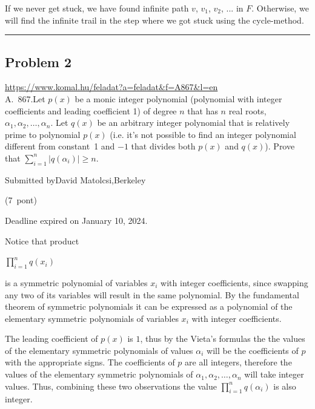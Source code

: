 \documentclass{article}
\begin{document}
If we never get stuck, we have found infinite path \(\displaystyle v\), \(\displaystyle v_1\), \(\displaystyle v_2\), ... in \(\displaystyle F\). Otherwise, we will find the infinite trail in the step where we got stuck using the cycle-method.

\vspace{1em}
\hrule
\vspace{1em}

\subsection*{Problem 2}
\noindent\url{https://www.komal.hu/feladat?a=feladat&f=A867&l=en}\\[1em]

A. 867.Let \(\displaystyle p(x)\) be a monic integer polynomial (polynomial with integer coefficients and leading coefficient 1) of degree \(\displaystyle n\) that has \(\displaystyle n\) real roots, \(\displaystyle \alpha_1, \alpha_2,\ldots, \alpha_n\). Let \(\displaystyle q(x)\) be an arbitrary integer polynomial that is relatively prime to polynomial \(\displaystyle p(x)\) (i.e. it's not possible to find an integer polynomial different from constant 1 and \(\displaystyle -1\) that divides both \(\displaystyle p(x)\) and \(\displaystyle q(x)\)). Prove that \(\displaystyle \sum\limits_{i=1}^{n} \big|q(\alpha_i)\big|\ge n\).

Submitted byDavid Matolcsi,Berkeley

(7 pont)

Deadline expired on January 10, 2024.

Notice that product

\(\displaystyle \prod_{i=1}^{n} q(x_i)\)

is a symmetric polynomial of variables \(\displaystyle x_i\) with integer coefficients, since swapping any two of its variables will result in the same polynomial. By the fundamental theorem of symmetric polynomials it can be expressed as a polynomial of the elementary symmetric polynomials of variables \(\displaystyle x_i\) with integer coefficients.

The leading coefficient of \(\displaystyle p(x)\) is \(\displaystyle 1\), thus by the Vieta's formulas the the values of the elementary symmetric polynomials of values \(\displaystyle \alpha_i\) will be the coefficients of \(\displaystyle p\) with the appropriate signs. The coefficients of \(\displaystyle p\) are all integers, therefore the values of the elementary symmetric polynomials of \(\displaystyle \alpha_1, \alpha_2, \ldots , \alpha_n\) will take integer values. Thus, combining these two observations the value \(\displaystyle \prod_{i=1}^{n} q(\alpha_i)\) is also integer.
\end{document}
